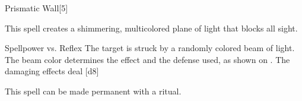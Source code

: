 \begin{spellsection}{Prismatic Wall}[5]
    \begin{spellheader}
    \end{spellheader}
    \begin{spellcontent}
        \begin{spelltargetinginfo}
        \end{spelltargetinginfo}
        \begin{spelleffects}
            \spelleffect This spell creates a shimmering, multicolored plane of light that blocks all sight.
            \spelldur \durshort \dismissable
        \end{spelleffects}
    \end{spellcontent}
    \begin{spellsubcontent}
        \begin{spelltargetinginfo}
        \end{spelltargetinginfo}
        \begin{spelleffects}
            \begin{spellattack}{Spellpower vs. Reflex}
                \spellspecial The target is struck by a randomly colored beam of light. The beam color determines the effect and the defense used, as shown on . The damaging effects deal \spelldamage{}[d8]
            \end{spellattack}
        \end{spelleffects}
    \end{spellsubcontent}
    \begin{spellfooter}
        \spellnotes This spell can be made permanent with a  ritual.
        \miscastexplode
    \end{spellfooter}
\end{spellsection}

